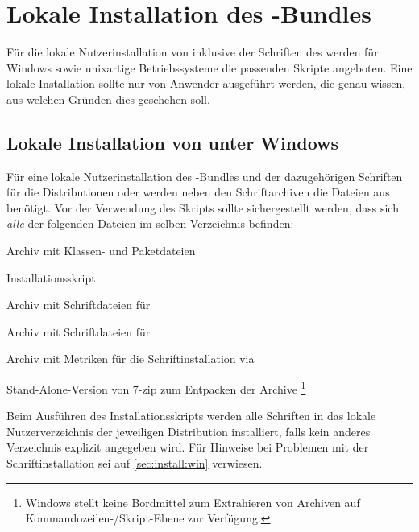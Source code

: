 \section{Lokale Installation des \TUDScript-Bundles}
\label{sec:local:install}
%
Für die lokale Nutzerinstallation von \TUDScript inklusive der Schriften des 
\CDs werden für Windows sowie unixartige Betriebssysteme die passenden Skripte 
angeboten. Eine lokale Installation sollte nur von Anwender ausgeführt werden, 
die genau wissen, aus welchen Gründen dies geschehen soll.


\subsection{Lokale Installation von \TUDScript unter Windows}
Für eine lokale Nutzerinstallation des \TUDScript-Bundles und der dazugehörigen 
Schriften für die Distributionen  oder 
 werden neben den Schriftarchiven die Dateien aus
%
{} benötigt. Vor der 
Verwendung des Skripts  sollte 
sichergestellt werden, dass sich \emph{alle} der folgenden Dateien im selben 
Verzeichnis befinden:
%
\settowidth{}%
\begin{description}[labelwidth=\tempdim,labelsep=1em]
  \item[\File{tudscr\_\vTUDScript.zip}]Archiv mit Klassen- und Paketdateien
  \item[\File{tudscr\_\vTUDScript\_install.bat}]Installationsskript
  \item[\File{Univers\_PS.zip}]Archiv mit Schriftdateien für \Univers
  \item[\File{DIN\_Bd\_PS.zip}]Archiv mit Schriftdateien für \DIN
  \item[\File{tudscrfonts.zip}]Archiv mit Metriken für die
    Schriftinstallation via 
  \item[\File{7za.exe}]Stand-Alone-Version von 7-zip zum Entpacken der Archive%
    \footnote{%
      Windows stellt keine Bordmittel zum Extrahieren von Archiven auf 
      Kommandozeilen-/Skript-Ebene zur Verfügung.%
    }%
\end{description}
%
Beim Ausführen des Installationsskripts werden alle Schriften in das lokale 
Nutzerverzeichnis der jeweiligen Distribution installiert, falls kein anderes 
Verzeichnis explizit angegeben wird. Für Hinweise bei Problemen mit der 
Schriftinstallation sei auf \autoref{sec:install:win} verwiesen.



